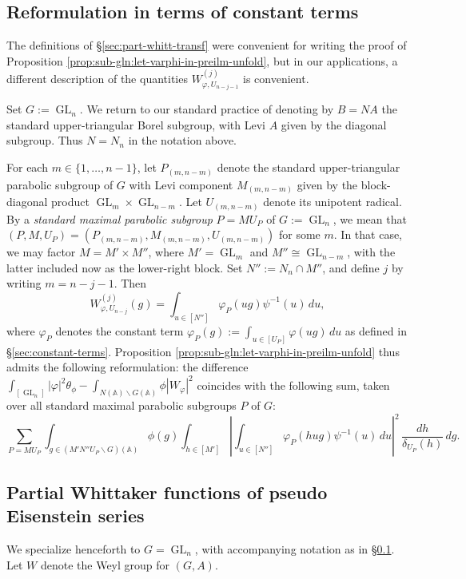 \documentclass[reqno]{amsart}
\DeclareMathOperator{\GL}{GL}
\theoremstyle{plain} \newtheorem{theorem} {Theorem}
\theoremstyle{definition} \newtheorem{definition} [theorem] {Definition}
\theoremstyle{itplain} %
\numberwithin{equation}{section}
\numberwithin{theorem}{section}
\begin{document}
\subsection{Reformulation in terms of constant terms}\label{sec:reform-terms-const-1}
The definitions of \S\ref{sec:part-whitt-transf} were convenient for writing the proof of Proposition \ref{prop:sub-gln:let-varphi-in-preilm-unfold}, but in our applications, a different description of the quantities $W_{\varphi,U_{n-j-1}}^{(j)}$ is convenient.

Set $G := \GL_n$.  We return to our standard practice of denoting by $B = N A$ the standard upper-triangular Borel subgroup, with Levi $A$ given by the diagonal subgroup.  Thus $N = N_n$ in the notation above.

For each $m \in \{1, \dotsc, n-1\}$, let $P_{(m,n-m)}$ denote the standard upper-triangular parabolic subgroup of $G$ with Levi component $M_{(m,n-m)}$ given by the block-diagonal product $\GL_m \times \GL_{n-m}$.  Let $U_{(m,n-m)}$ denote its unipotent radical.  By a \emph{standard maximal parabolic subgroup} $P = M U_P$ of $G := \GL_n$, we mean that $(P,M,U_P) = (P_{(m,n-m)}, M_{(m,n-m)}, U_{(m,n-m)})$ for some $m$.  In that case, we may factor $M = M' \times M''$, where $M' = \GL_m$ and $M'' \cong \GL_{n-m}$, with the latter included now as the lower-right block.  Set $N'' := N_n \cap M''$, and define $j$ by writing $m = n -j - 1$.  Then
\begin{equation*}
  W_{\varphi,U_{n-j}}^{(j)}(g)
  = \int _{u \in [N'']}
  \varphi_{P}(u g) \psi^{-1}(u) \, d u,
\end{equation*}
where $\varphi_P$ denotes the constant term $\varphi_{P}(g) := \int _{u \in [U_P]} \varphi(u g) \, d u$ as defined in \S\ref{sec:constant-terms}.  Proposition \ref{prop:sub-gln:let-varphi-in-preilm-unfold} thus admits the following reformulation: the difference $\int _{[\GL_n]} |\varphi|^2 \theta_\phi - \int _{N(\mathbb{A}) \backslash G(\mathbb{A})} \phi |W_\varphi|^2$ coincides with the following sum, taken over all standard maximal parabolic subgroups $P$ of $G$:
\begin{equation}\label{eq:sum_-p-=}
 \sum_{
    P = M U_P
  }
  \int _{g \in (M' N'' U_P \backslash G)(\mathbb{A})}
  \phi (g)
  \int _{h \in [M']}
  \left\lvert
    \int _{u \in [N'']}
    \varphi_P(h u g) \psi^{-1}(u) \, d u
\right\rvert^2 \, \frac{d h}{\delta_{U_P}(h)} \, d g.
\end{equation}

\subsection{Partial Whittaker functions of pseudo Eisenstein series}
We specialize henceforth to $G = \GL_n$, with accompanying notation as in \S\ref{sec:reform-terms-const-1}.  Let $W$ denote the Weyl group for $(G,A)$.  
\end{document}
